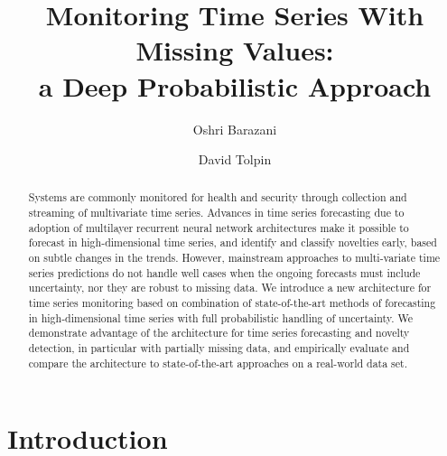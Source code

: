 \documentclass[runningheads]{llncs}
\begin{document}
\title{Monitoring Time Series With Missing Values:\\a Deep Probabilistic Approach}

\author{Oshri Barazani \and David Tolpin}


\maketitle

\begin{abstract}
Systems are commonly monitored for health and security through
collection and streaming of multivariate time series. Advances
in time series forecasting due to adoption of multilayer
recurrent neural network architectures make it possible to
forecast in high-dimensional time series, and identify and
classify novelties early, based on subtle changes in the trends.
However, mainstream approaches to multi-variate time series
predictions do not handle well cases when the ongoing forecasts
must include uncertainty, nor they are robust to missing data.
We introduce a new architecture for time series monitoring based
on combination of state-of-the-art methods of forecasting in
high-dimensional time series with full probabilistic handling of
uncertainty. We demonstrate advantage of the architecture for
time series forecasting and novelty detection, in particular
with partially missing data, and empirically evaluate and
compare the architecture to state-of-the-art approaches on a
real-world data set.
\end{abstract}



\section{Introduction}
\end{document}
